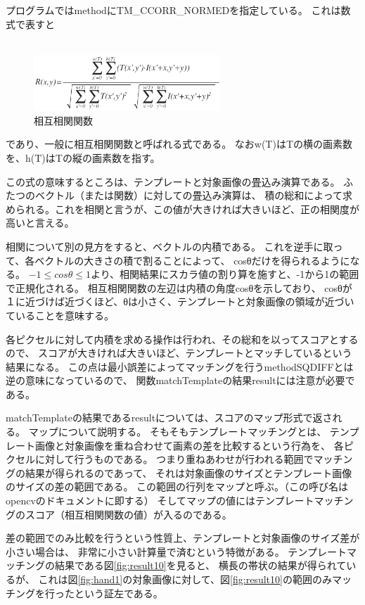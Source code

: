 \documentclass{jsarticle}
\begin{document}
\begin{multicols}{2}
プログラムではmethodにTM\_CCORR\_NORMEDを指定している。
これは数式で表すと
\\ \\ 
\begin{figure}[H]
  \begin{center}
    \includegraphics[clip,width=7.0cm]{./img/ccorr.png}
    \caption{相互相関関数}
    \label{fig:ccorr}
  \end{center}
\end{figure}
であり、一般に相互相関関数と呼ばれる式である。
なおw(T)はTの横の画素数を、h(T)はTの縦の画素数を指す。

この式の意味するところは、テンプレートと対象画像の畳込み演算である。
ふたつのベクトル（または関数）に対しての畳込み演算は、
積の総和によって求められる。これを相関と言うが、この値が大きければ大きいほど、正の相関度が高いと言える。

相関について別の見方をすると、ベクトルの内積である。
これを逆手に取って、各ベクトルの大きさの積で割ることによって、
cosθだけを得られるようになる。
$-1\le cos\theta \le 1$より、相関結果にスカラ値の割り算を施すと、-1から1の範囲で正規化される。
相互相関関数の左辺は内積の角度cosθを示しており、
cosθが１に近づけば近づくほど、θは小さく、テンプレートと対象画像の領域が近づいていることを意味する。

各ピクセルに対して内積を求める操作は行われ、その総和を以ってスコアとするので、
スコアが大きければ大きいほど、テンプレートとマッチしているという結果になる。
この点は最小誤差によってマッチングを行うmethodSQDIFFとは逆の意味になっているので、
関数matchTemplateの結果resultには注意が必要である。

matchTemplateの結果であるresultについては、スコアのマップ形式で返される。
マップについて説明する。
そもそもテンプレートマッチングとは、
テンプレート画像と対象画像を重ね合わせて画素の差を比較するという行為を、
各ピクセルに対して行うものである。
つまり重ねあわせが行われる範囲でマッチングの結果が得られるのであって、
それは対象画像のサイズとテンプレート画像のサイズの差の範囲である。
この範囲の行列をマップと呼ぶ。（この呼び名はopencvのドキュメント\cite{matchTemplateC}\cite{matchTemplatePy}に即する）
そしてマップの値にはテンプレートマッチングのスコア（相互相関関数の値）が入るのである。

差の範囲でのみ比較を行うという性質上、テンプレートと対象画像のサイズ差が小さい場合は、
非常に小さい計算量で済むという特徴がある。
テンプレートマッチングの結果である図\ref{fig:result10}を見ると、
横長の帯状の結果が得られているが、
これは図\ref{fig:hand1}の対象画像に対して、図\ref{fig:result10}の範囲のみマッチングを行ったという証左である。

%

\end{multicols}
\end{document}
